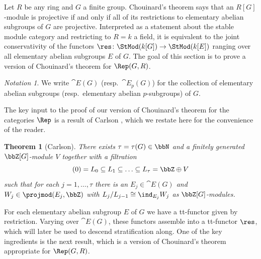 \documentclass{amsart}%
\numberwithin{equation}{section}%
\newtheorem{Thm}[equation]{Theorem}
\theoremstyle{remark}
\newtheorem{Not}[equation]{Notation}
\begin{document}
Let $R$ be any ring and $G$ a finite group. Chouinard's theorem \cite[Cor.~1.1]{Chouinard76} says that an $R[G]$-module is projective if and only if all of its restrictions to elementary abelian subgroups of $G$ are projective. Interpreted as a statement about the stable module category and restricting to $R = k$ a field, it is equivalent to the joint conservativity of the functors $\res\colon \StMod(k[G]) \to \StMod(k[E])$ ranging over all elementary abelian subgroups $E$ of $G$. The goal of this section is to prove a version of Chouinard's theorem for $\Rep(G,R)$. 

\begin{Not}
We write $\cat E(G)$ (resp.~$\cat E_p(G)$) for the collection of elementary abelian subgroups (resp.~elementary abelian $p$-subgroups) of $G$.
\end{Not}

The key input to the proof of our version of Chouinard's theorem for the categories $\Rep$ is a result of Carlson \cite{Carlson00}, which we restate here for the convenience of the reader.

\begin{Thm}[Carlson]\label{thm:carlson}
There exists $\tau = \tau(G) \in \bbN$ and a finitely generated $\bbZ[G]$-module $V$ together with a filtration
\[
(0) = L_0 \subseteq L_1 \subseteq \ldots \subseteq L_{\tau} = \bbZ \oplus V
\]
such that for each $j = 1,\ldots,\tau$ there is an $E_j \in \cat E(G)$ and $W_j \in \projmod(E_j,\bbZ)$ with $L_j/L_{j-1} \cong \ind_{E_j}W_j$ as $\bbZ[G]$-modules.
\end{Thm}

For each elementary abelian subgroup $E$ of $G$ we have a tt-functor given by restriction. Varying over $\cat E(G)$, these functors assemble into a tt-functor $\res$, which will later be used to descend stratification along. One of the key ingredients is the next result, which is a version of Chouinard's theorem appropriate for $\Rep(G,R)$.
\end{document}
